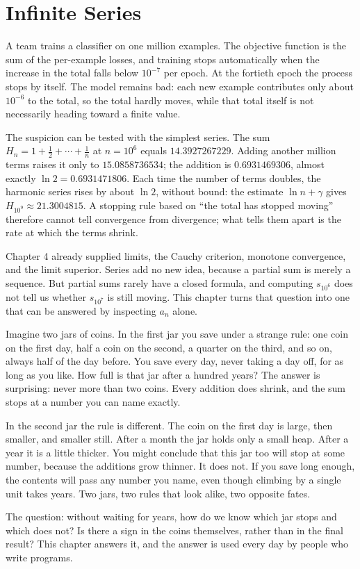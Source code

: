 \chapter{Infinite Series}

A team trains a classifier on one million examples. The objective function is the sum of
the per-example losses, and training stops automatically when the increase in the total
falls below $10^{-7}$ per epoch. At the fortieth epoch the process stops by itself. The
model remains bad: each new example contributes only about $10^{-6}$ to the total, so the
total hardly moves, while that total itself is not necessarily heading toward a finite
value.

The suspicion can be tested with the simplest series. The sum
$H_n = 1 + \tfrac{1}{2} + \cdots + \tfrac{1}{n}$ at $n=10^6$ equals
$14.3927267229$. Adding another million terms raises it only to
$15.0858736534$; the addition is $0.6931469306$, almost exactly $\ln 2 = 0.6931471806$.
Each time the number of terms doubles, the harmonic series rises by about $\ln 2$, without
bound: the estimate $\ln n + \gamma$ gives $H_{10^9} \approx 21.3004815$. A stopping rule
based on ``the total has stopped moving'' therefore cannot tell convergence from
divergence; what tells them apart is the rate at which the terms shrink.

Chapter 4 already supplied limits, the Cauchy criterion, monotone convergence, and the
limit superior. Series add no new idea, because a partial sum is merely a sequence. But
partial sums rarely have a closed formula, and computing $s_{10^6}$ does not tell us
whether $s_{10^7}$ is still moving. This chapter turns that question into one that can be
answered by inspecting $a_n$ alone.

\begin{untukanak}
Imagine two jars of coins. In the first jar you save under a strange rule:
one coin on the first day, half a coin on the second, a quarter on the third, and so on,
always half of the day before. You save every day, never taking a day off, for as long as
you like. How full is that jar after a hundred years? The answer is surprising: never more
than two coins. Every addition does shrink, and the sum stops at a number you can name
exactly.

In the second jar the rule is different. The coin on the first day is large, then smaller,
and smaller still. After a month the jar holds only a small heap. After a year it is a
little thicker. You might conclude that this jar too will stop at some number, because the
additions grow thinner. It does not. If you save long enough, the contents will pass any
number you name, even though climbing by a single unit takes years. Two jars, two rules
that look alike, two opposite fates.

The question: without waiting for years, how do we know which jar stops and which does
not? Is there a sign in the coins themselves, rather than in the final result? This
chapter answers it, and the answer is used every day by people who write programs.
\end{untukanak}

